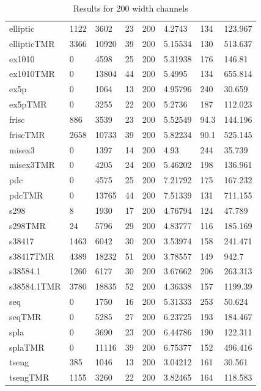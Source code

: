 \documentclass[12pt,final,oneside]{dwThesis} %
\begin{document}
\begin{table}
\begin{adjustwidth}{-1cm}{-1.2cm}
\begin{tabularx}{1.1\textwidth}{llllp{1.5cm}p{2.2cm}p{1.5cm}X}
            elliptic & 1122 & 3602 & 23 & 200 & 4.2743 &134 & 123.967\\
            ellipticTMR & 3366 & 10920 & 39 & 200 & 5.15534 &130 & 513.637\\\midrule
            ex1010 & 0 & 4598 & 25 & 200 & 5.31938 &176 & 146.81\\
            ex1010TMR & 0 & 13804 & 44 & 200 & 5.4995 &134 & 655.814\\\midrule
            ex5p & 0 & 1064 & 13 & 200 & 4.95796 &240 & 30.659\\
            ex5pTMR & 0 & 3255 & 22 & 200 & 5.2736 &187 & 112.023\\\midrule
            frisc & 886 & 3539 & 23 & 200 & 5.52549 &94.3 & 144.196\\
            friscTMR & 2658 & 10733 & 39 & 200 & 5.82234 &90.1 & 525.145\\\midrule
            misex3 & 0 & 1397 & 14 & 200 & 4.93 &244 & 35.739\\
            misex3TMR & 0 & 4205 & 24 & 200 & 5.46202 &198 & 136.961\\\midrule
            pdc & 0 & 4575 & 25 & 200 & 7.21792 &175 & 167.232\\
            pdcTMR & 0 & 13765 & 44 & 200 & 7.51339 &131 & 711.155\\\midrule
            s298 & 8 & 1930 & 17 & 200 & 4.76794 &124 & 47.789\\
            s298TMR & 24 & 5796 & 29 & 200 & 4.83777 &116 & 185.169\\\midrule
            s38417 & 1463 & 6042 & 30 & 200 & 3.53974 &158 & 241.471\\
            s38417TMR & 4389 & 18232 & 51 & 200 & 3.78557 &149 & 942.7\\\midrule
            s38584.1 & 1260 & 6177 & 30 & 200 & 3.67662 &206 & 263.313\\
            s38584.1TMR & 3780 & 18835 & 52 & 200 & 4.36338 &157 & 1199.39\\\midrule
            seq & 0 & 1750 & 16 & 200 & 5.31333 &253 & 50.624\\
            seqTMR & 0 & 5285 & 27 & 200 & 6.23725 &193 & 184.467\\\midrule
            spla & 0 & 3690 & 23 & 200 & 6.44786 &190 & 122.311\\
            splaTMR & 0 & 11116 & 39 & 200 & 6.75377 &152 & 496.416\\\midrule
            tseng & 385 & 1046 & 13 & 200 & 3.04212 &161 & 30.561\\
            tsengTMR & 1155 & 3260 & 22 & 200 & 3.82465 &164 & 118.583\\\bottomrule
         \end{tabularx}
         \caption{Results for 200 width channels}
         \label{Results200}
      \end{adjustwidth}
   \end{table}
\end{document}
